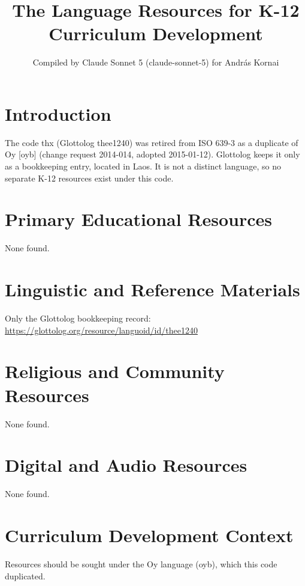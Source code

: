 \documentclass[12pt]{article}
\title{The Language Resources for K-12 Curriculum Development}
\author{Compiled by Claude Sonnet 5 (claude-sonnet-5) for Andr\'as Kornai}
\date{}
\begin{document}
\maketitle
\section{Introduction}
The code thx (Glottolog thee1240) was retired from ISO 639-3 as a duplicate of Oy [oyb] (change request 2014-014, adopted 2015-01-12). Glottolog keeps it only as a bookkeeping entry, located in Laos. It is not a distinct language, so no separate K-12 resources exist under this code.
\section{Primary Educational Resources}
None found.
\section{Linguistic and Reference Materials}
Only the Glottolog bookkeeping record: \url{https://glottolog.org/resource/languoid/id/thee1240}
\section{Religious and Community Resources}
None found.
\section{Digital and Audio Resources}
None found.
\section{Curriculum Development Context}
Resources should be sought under the Oy language (oyb), which this code duplicated.
\end{document}
